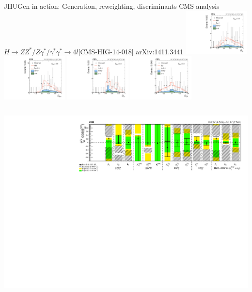 \documentclass[usenames,dvipsnames,svgnames,table]{beamer}
\begin{document}
\begin{frame}{JHUGen in action: Generation, reweighting, discriminants}{
CMS analysis $H \to ZZ^*/Z\gamma^*/\gamma^*\gamma^* \to 4l$\hfill [CMS-HIG-14-018] arXiv:1411.3441
}
\includegraphics[width=0.25\textwidth]{HVV/d0minus}
\includegraphics[width=0.25\textwidth]{HVV/d0hplus}
\includegraphics[width=0.25\textwidth]{HVV/dlambda1}
\includegraphics[width=0.25\textwidth]{HVV/dcp}
\\
\begin{columns}
\begin{column}{0.6\textwidth}
\includegraphics[width=\textwidth]{HVV/summary_a2a3lambda1}

\end{column}
\end{columns}
\end{frame}
\end{document}
